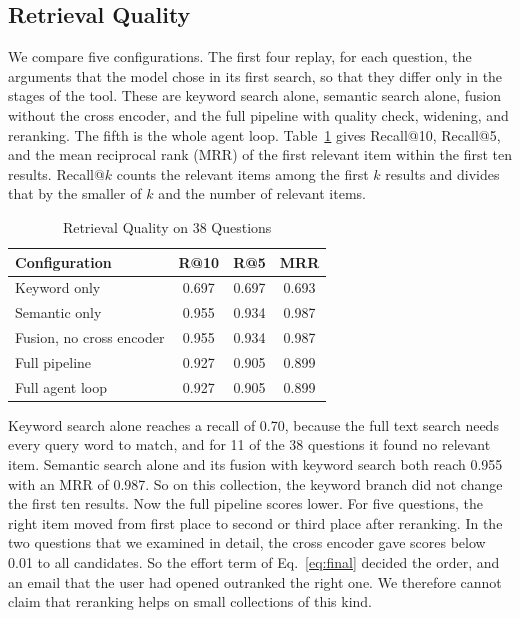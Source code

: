 \documentclass[conference]{IEEEtran}
\begin{document}
\subsection{Retrieval Quality}
We compare five configurations. The first four replay, for each question, the arguments that the model chose in its first search, so that they differ only in the stages of the tool. These are keyword search alone, semantic search alone, fusion without the cross encoder, and the full pipeline with quality check, widening, and reranking. The fifth is the whole agent loop. Table~\ref{tab:results} gives Recall@10, Recall@5, and the mean reciprocal rank (MRR) of the first relevant item within the first ten results. Recall@$k$ counts the relevant items among the first $k$ results and divides that by the smaller of $k$ and the number of relevant items.

\begin{table}[t]
\caption{Retrieval Quality on 38 Questions}
\label{tab:results}
\centering
\renewcommand{\arraystretch}{1.15}
\begin{tabular}{|l|c|c|c|}
\hline
\textbf{Configuration} & \textbf{R@10} & \textbf{R@5} & \textbf{MRR} \\
\hline
Keyword only & 0.697 & 0.697 & 0.693 \\
\hline
Semantic only & 0.955 & 0.934 & 0.987 \\
\hline
Fusion, no cross encoder & 0.955 & 0.934 & 0.987 \\
\hline
Full pipeline & 0.927 & 0.905 & 0.899 \\
\hline
Full agent loop & 0.927 & 0.905 & 0.899 \\
\hline
\end{tabular}
\end{table}

Keyword search alone reaches a recall of 0.70, because the full text search needs every query word to match, and for 11 of the 38 questions it found no relevant item. Semantic search alone and its fusion with keyword search both reach 0.955 with an MRR of 0.987. So on this collection, the keyword branch did not change the first ten results. Now the full pipeline scores lower. For five questions, the right item moved from first place to second or third place after reranking. In the two questions that we examined in detail, the cross encoder gave scores below 0.01 to all candidates. So the effort term of Eq.~\eqref{eq:final} decided the order, and an email that the user had opened outranked the right one. We therefore cannot claim that reranking helps on small collections of this kind.
\end{document}
